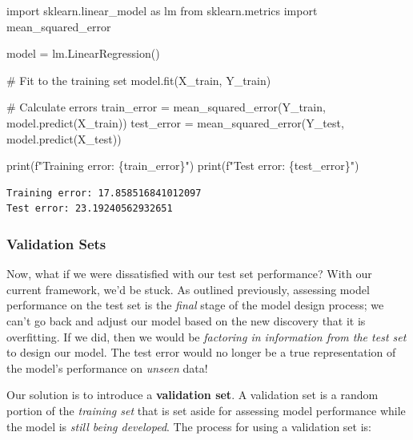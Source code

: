 \documentclass[
  letterpaper,
  DIV=11,
  numbers=noendperiod]{scrreprt}
\newenvironment{Shaded}{\begin{snugshade}}{\end{snugshade}}
\newcommand{\BuiltInTok}[1]{\textcolor[rgb]{0.00,0.23,0.31}{#1}}
\newcommand{\CommentTok}[1]{\textcolor[rgb]{0.37,0.37,0.37}{#1}}
\newcommand{\ImportTok}[1]{\textcolor[rgb]{0.00,0.46,0.62}{#1}}
\newcommand{\NormalTok}[1]{\textcolor[rgb]{0.00,0.23,0.31}{#1}}
\newcommand{\OperatorTok}[1]{\textcolor[rgb]{0.37,0.37,0.37}{#1}}
\newcommand{\SpecialCharTok}[1]{\textcolor[rgb]{0.37,0.37,0.37}{#1}}
\newcommand{\SpecialStringTok}[1]{\textcolor[rgb]{0.13,0.47,0.30}{#1}}
\begin{document}
\begin{Shaded}
\begin{Highlighting}[]
\ImportTok{import}\NormalTok{ sklearn.linear\_model }\ImportTok{as}\NormalTok{ lm}
\ImportTok{from}\NormalTok{ sklearn.metrics }\ImportTok{import}\NormalTok{ mean\_squared\_error}

\NormalTok{model }\OperatorTok{=}\NormalTok{ lm.LinearRegression()}

\CommentTok{\# Fit to the training set}
\NormalTok{model.fit(X\_train, Y\_train)}

\CommentTok{\# Calculate errors}
\NormalTok{train\_error }\OperatorTok{=}\NormalTok{ mean\_squared\_error(Y\_train, model.predict(X\_train))}
\NormalTok{test\_error }\OperatorTok{=}\NormalTok{ mean\_squared\_error(Y\_test, model.predict(X\_test))}

\BuiltInTok{print}\NormalTok{(}\SpecialStringTok{f"Training error: }\SpecialCharTok{\{}\NormalTok{train\_error}\SpecialCharTok{\}}\SpecialStringTok{"}\NormalTok{)}
\BuiltInTok{print}\NormalTok{(}\SpecialStringTok{f"Test error: }\SpecialCharTok{\{}\NormalTok{test\_error}\SpecialCharTok{\}}\SpecialStringTok{"}\NormalTok{)}
\end{Highlighting}
\end{Shaded}

\begin{verbatim}
Training error: 17.858516841012097
Test error: 23.19240562932651
\end{verbatim}

\subsubsection{Validation Sets}\label{validation-sets}

Now, what if we were dissatisfied with our test set performance? With
our current framework, we'd be stuck. As outlined previously, assessing
model performance on the test set is the \emph{final} stage of the model
design process; we can't go back and adjust our model based on the new
discovery that it is overfitting. If we did, then we would be
\emph{factoring in information from the test set} to design our model.
The test error would no longer be a true representation of the model's
performance on \emph{unseen} data!

Our solution is to introduce a \textbf{validation set}. A validation set
is a random portion of the \emph{training set} that is set aside for
assessing model performance while the model is \emph{still being
developed}. The process for using a validation set is:
\end{document}
